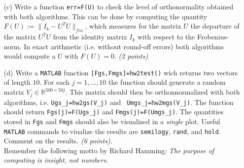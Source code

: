 \documentclass[10pt]{report}
\begin{document}
\begin{enumerate}
\begin{enumerate}
    \item[(c)]  Write a function \verb+err=F(U)+ to check the level of orthonormality obtained with both
    algorithms. 
    This can be done by computing the quantity $F(U):=\|I_k-U^TU\|_{fro}$, which
    measures for the matrix $U$ the departure of the matrix $U^TU$ from the
    identity matrix $I_k$ with respect to the Frobenius-norm. In exact
    arithmetic (i.e. without round-off errors) both algorithms would compute
    a $U$ with $F(U)=0$. \textit{(2 points)}

    \item[(d)]  Write a \verb+MATLAB+ function \verb+[Fgs,Fmgs]=hw2test()+ wich
    returns two vectors of length $10$. For each $j=1,\ldots,10$ the function
    should generate a random matrix $V_j\in\mathbb{R}^{500\times50j}$. This
    matrix should then be orthonnormalized with both algorithms, i.e.
    \verb+Ugs_j=hw2gs(V_j)+ and \verb+ Umgs_j=hw2mgs(V_j)+. The function should return
    \verb+Fgs(j)=F(Ugs_j)+ and \verb+Fmgs(j)=F(Umgs_j)+. The quantities stored in \verb+Fgs+
    and \verb+Fmgs+ should also be visualized in a \textit{single} plot. Useful \verb+MATLAB+ commands to viualize the results are \verb+semilogy+, \verb+rand+, and \verb+hold+. Comment on the results. \textit{(6 points).}\\


Remember the following motto by Richard Hamming: 
\textit{The purpose of computing is insight, not numbers.}
\end{enumerate}



\end{enumerate}
\end{document}

